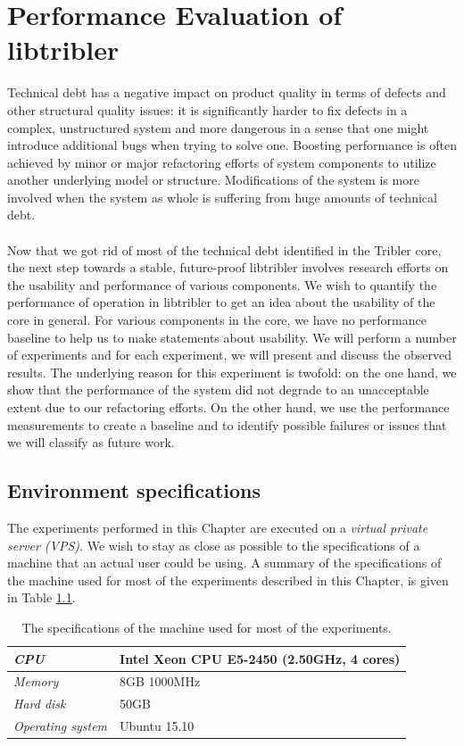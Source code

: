\chapter{Performance Evaluation of libtribler}
\label{chapter:experiments}

Technical debt has a negative impact on product quality in terms of defects and other structural quality issues\cite{tom2013exploration}: it is significantly harder to fix defects in a complex, unstructured system and more dangerous in a sense that one might introduce additional bugs when trying to solve one. Boosting performance is often achieved by minor or major refactoring efforts of system components to utilize another underlying model or structure. Modifications of the system is more involved when the system as whole is suffering from huge amounts of technical debt.\\\\
Now that we got rid of most of the technical debt identified in the Tribler core, the next step towards a stable, future-proof libtribler involves research efforts on the usability and performance of various components. We wish to quantify the performance of operation in libtribler to get an idea about the usability of the core in general. For various components in the core, we have no performance baseline to help us to make statements about usability. We will perform a number of experiments and for each experiment, we will present and discuss the observed results. The underlying reason for this experiment is twofold: on the one hand, we show that the performance of the system did not degrade to an  unacceptable extent due to our refactoring efforts. On the other hand, we use the performance measurements to create a baseline and to identify possible failures or issues that we will classify as future work.

\section{Environment specifications}
The experiments performed in this Chapter are executed on a \emph{virtual private server (VPS)}. We wish to stay as close as possible to the specifications of a machine that an actual user could be using. A summary of the specifications of the machine used for most of the experiments described in this Chapter, is given in Table \ref{table:experiments-server-specifications}.

\begin{table}[h!]
	\centering
	\begin{tabular}{|l|l|}
		\hline
		\emph{CPU} & Intel Xeon CPU E5-2450 (2.50GHz, 4 cores)\\ \hline
		\emph{Memory} & 8GB 1000MHz \\ \hline
		\emph{Hard disk} & 50GB \\ \hline
		\emph{Operating system} & Ubuntu 15.10 \\ \hline
	\end{tabular}
	\caption{The specifications of the machine used for most of the experiments.}
	\label{table:experiments-server-specifications}
\end{table}

